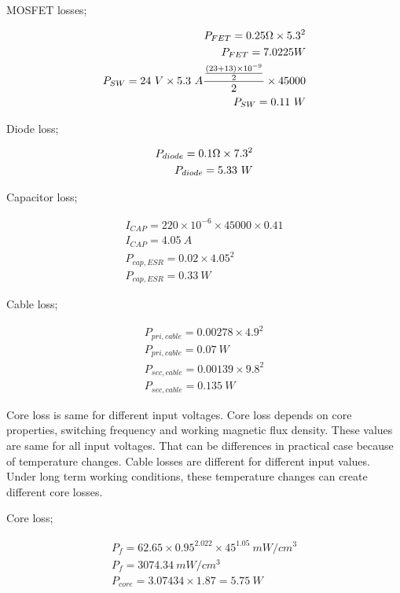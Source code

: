 MOSFET losses;

\begin{align}
     P_{FET} = 0.25 \ohm \times 5.3^2\\
     P_{FET} = 7.0225 W \\
     P_{SW} = 24\ V\times 5.3\ A \frac{\frac{(23+13)\times 10^{-9}}{2}}{2}\times 45000 \\
     P_{SW} = 0.11\ W
\end{align}

Diode loss;

\begin{align}
 P_{diode} = 0.1 \ohm \times 7.3 ^2 \\
 P_{diode} = 5.33\ W
\end{align}

Capacitor loss;

\begin{align}
     I_{CAP} =  220\times 10^{-6} \times 45000 \times 0.41 \\
     I_{CAP} = 4.05\ A\ \\
     P_{cap,ESR} = 0.02 \times 4.05^2 \\
     P_{cap,ESR} = 0.33\ W     
\end{align}

Cable loss;

 \begin{align}
     P_{pri,cable} = 0.00278 \times 4.9^2 \\
     P_{pri,cable} = 0.07\ W     \\
     P_{sec,cable} = 0.00139 \times 9.8^2 \\
     P_{sec,cable} = 0.135\ W
 \end{align}
 
 Core loss is same for different input voltages. Core loss depends on core properties, switching frequency and working magnetic flux density. These values are same for all input voltages. That can be differences in practical case because of temperature changes. Cable losses are different for different input values. Under long term working conditions, these temperature changes can create  different core losses. 
 
 Core loss;

 \begin{align}
     P_f = 62.65\times 0.95^2.022 \times 45^1.05\ mW/cm^3\\
     P_f = 3074.34\ mW/cm^3 \\
     P_{core} = 3.07434 \times 1.87 = 5.75\ W
 \end{align}
 
